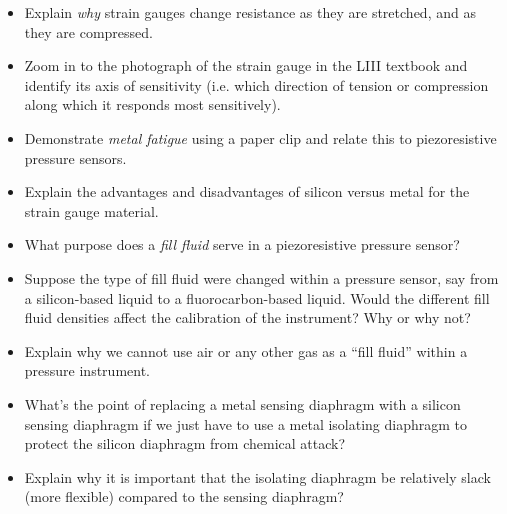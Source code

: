\begin{itemize}
\item{} Explain {\it why} strain gauges change resistance as they are stretched, and as they are compressed.
\item{} Zoom in to the photograph of the strain gauge in the LIII textbook and identify its axis of sensitivity (i.e. which direction of tension or compression along which it responds most sensitively).
\item{} Demonstrate {\it metal fatigue} using a paper clip and relate this to piezoresistive pressure sensors.
\item{} Explain the advantages and disadvantages of silicon versus metal for the strain gauge material.
\item{} What purpose does a {\it fill fluid} serve in a piezoresistive pressure sensor?
\item{} Suppose the type of fill fluid were changed within a pressure sensor, say from a silicon-based liquid to a fluorocarbon-based liquid.  Would the different fill fluid densities affect the calibration of the instrument?  Why or why not?
\item{} Explain why we cannot use air or any other gas as a ``fill fluid'' within a pressure instrument.
\item{} What's the point of replacing a metal sensing diaphragm with a silicon sensing diaphragm if we just have to use a metal isolating diaphragm to protect the silicon diaphragm from chemical attack?
\item{} Explain why it is important that the isolating diaphragm be relatively slack (more flexible) compared to the sensing diaphragm?
\end{itemize}





